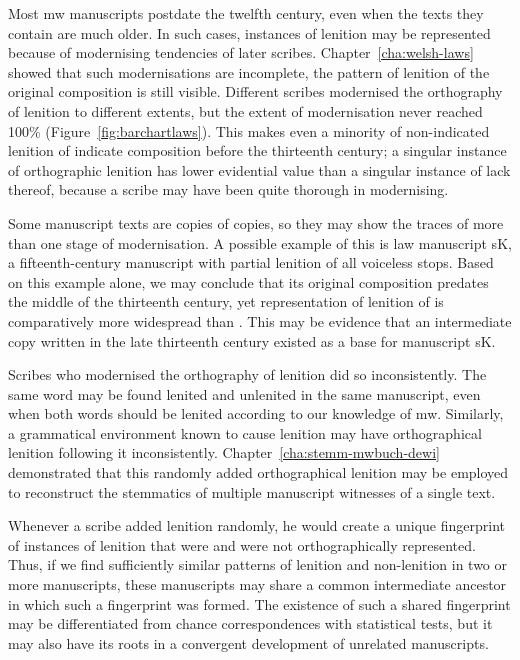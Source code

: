 Most \gls{mw} manuscripts postdate the twelfth century, even when the texts they contain are much older. In such cases, instances of lenition may be represented because of modernising tendencies of later scribes. Chapter~\ref{cha:welsh-laws} showed  that such modernisations are incomplete, \ie the pattern of lenition of the original composition is still visible. Different scribes  modernised the orthography of lenition to different extents, but the extent of modernisation never reached 100\% (Figure~\ref{fig:barchartlaws}). This makes even a minority of non-indicated lenition of  indicate composition before the thirteenth century; a singular instance of orthographic lenition has lower evidential value than a singular instance of lack thereof, because a scribe may have been quite thorough in modernising.

Some manuscript texts are copies of copies, so they may show the traces of more than one stage of modernisation. A possible example of this is law manuscript \gls{sK}, a fifteenth-century manuscript with partial lenition of all voiceless stops. Based on this example alone, we may conclude that its original composition predates the middle of the thirteenth century, yet representation of lenition of  is comparatively more widespread than . This may be evidence that an intermediate copy written in the late thirteenth century existed as a base for manuscript \gls{sK}.

Scribes who modernised the orthography of lenition did so inconsistently. The same word may be found lenited and unlenited in the same manuscript, even when both words should be lenited according to our knowledge of \gls{mw}. Similarly, a grammatical environment known to cause lenition may have orthographical lenition following it inconsistently. Chapter~\ref{cha:stemm-mwbuch-dewi} demonstrated that this randomly added orthographical lenition may be employed to reconstruct the stemmatics of multiple manuscript witnesses of a single text.

Whenever a scribe added lenition randomly, he would create a unique fingerprint of instances of lenition that were and were not orthographically represented. Thus, if we find sufficiently similar patterns of lenition and non-lenition in two or more manuscripts, these manuscripts may share a common intermediate ancestor in which such a fingerprint was formed. The existence of such a shared fingerprint may be differentiated from chance correspondences with statistical tests, but it may also have its roots in a convergent development of  unrelated manuscripts.

